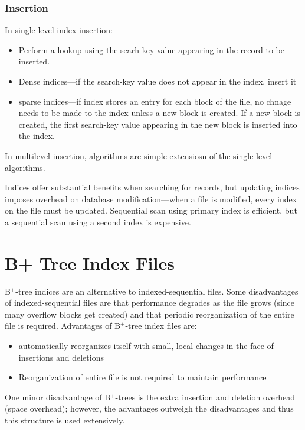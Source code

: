 \documentclass{article}
\begin{document}
\subsubsection{Insertion}

In single-level index insertion: 
\begin{itemize}
  \item Perform a lookup using the searh-key value appearing in the record to be inserted. 
  \item Dense indices---if the search-key value does not appear in the index, insert it 
  \item sparse indices---if index stores an entry for each block of the file, no chnage needs to be made to the index unless a new block is created. If a new block is created, the first search-key value appearing in the new block is inserted into the index. 
\end{itemize}
In multilevel insertion, algorithms are simple extensiosn of the single-level algorithms. 

Indices offer substantial benefits when searching for records, but updating indices imposes overhead on database modification---when a file is modified, every index on the file must be updated. Sequential scan using primary index is efficient, but a sequential scan using a second index is expensive. 

\section{B+ Tree Index Files}

B$^{+}$-tree indices are an alternative to indexed-sequential files. Some disadvantages of indexed-sequential files are that performance degrades as the file grows (since many overflow blocks get created) and that periodic reorganization of the entire file is required. Advantages of B$^{+}$-tree index files are: 
\begin{itemize}
  \item automatically reorganizes itself with small, local changes in the face of insertions and deletions 
  \item Reorganization of entire file is not required to maintain performance
\end{itemize}
One minor disadvantage of B$^{+}$-trees is the extra insertion and deletion overhead (space overhead); however, the advantages outweigh the disadvantages and thus this structure is used extensively. \\ 
\end{document}
